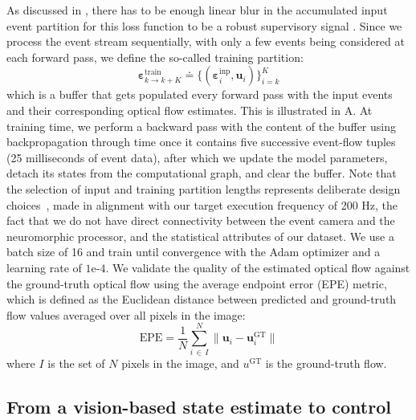 As discussed in \cite{hagenaars2021selfsupervised,paredes-valles2023taming}, there has to be enough linear blur in the accumulated input event partition for this loss function to be a robust supervisory signal \cite{gallego2019focus, stoffregen2019event}. Since we process the event stream sequentially, with only a few events being considered at each forward pass, we define the so-called training partition:
\begin{equation}
    \boldsymbol{\varepsilon}^{\text{train}}_{k\rightarrow k+K}\doteq\{(\boldsymbol{\varepsilon}^{\text{inp}}_{i}, \boldsymbol{u}_i)\}_{i=k}^{K}
\end{equation}
which is a buffer that gets populated every forward pass with the input events and their corresponding optical flow estimates. This is illustrated in A. At training time, we perform a backward pass with the content of the buffer using backpropagation through time once it contains five successive event-flow tuples (25 milliseconds of event data), after which we update the model parameters, detach its states from the computational graph, and clear the buffer. Note that the selection of input and training partition lengths represents deliberate design choices~\cite{valerdi2023insights}, made in alignment with our target execution frequency of 200 Hz, the fact that we do not have direct connectivity between the event camera and the neuromorphic processor, and the statistical attributes of our dataset. We use a batch size of 16 and train until convergence with the Adam optimizer \cite{kingma2017adam} and a learning rate of $1\mathrm{e}{}$-$4$. We validate the quality of the estimated optical flow against the ground-truth optical flow using the average endpoint error (EPE) metric, which is defined as the Euclidean distance between predicted and ground-truth flow values averaged over all pixels in the image:
\begin{equation}
    \mathrm{EPE} = \frac{1}{N}\sum_{i\,\in\,I}^N \lVert \boldsymbol{u}_i - \boldsymbol{u}_i^\mathrm{GT} \rVert
\end{equation}
where $I$ is the set of $N$ pixels in the image, and $u^\mathrm{GT}$ is the ground-truth flow.

\subsection*{From a vision-based state estimate to control}

